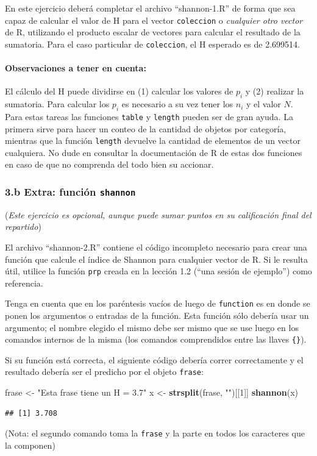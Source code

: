 \documentclass[]{article}
\newenvironment{Shaded}{}{}
\newcommand{\KeywordTok}[1]{\textcolor[rgb]{0.00,0.44,0.13}{\textbf{{#1}}}}
\newcommand{\DecValTok}[1]{\textcolor[rgb]{0.25,0.63,0.44}{{#1}}}
\newcommand{\StringTok}[1]{\textcolor[rgb]{0.25,0.44,0.63}{{#1}}}
\newcommand{\NormalTok}[1]{{#1}}
\begin{document}
En este ejercicio deberá completar el archivo ``shannon-1.R'' de forma
que sea capaz de calcular el valor de H para el vector
\texttt{coleccion} o \emph{cualquier otro vector} de R, utilizando el
producto escalar de vectores para calcular el resultado de la sumatoria.
Para el caso particular de \texttt{coleccion}, el H esperado es de
2.699514.

\paragraph{Observaciones a tener en cuenta:}

El cálculo del H puede dividirse en (1) calcular los valores de $p_i$ y
(2) realizar la sumatoria. Para calcular los $p_i$ es necesario a su vez
tener los $n_i$ y el valor $N$. Para estas tareas las funciones
\texttt{table} y \texttt{length} pueden ser de gran ayuda. La primera
sirve para hacer un conteo de la cantidad de objetos por categoría,
mientras que la función \texttt{length} devuelve la cantidad de
elementos de un vector cualquiera. No dude en consultar la documentación
de R de estas dos funciones en caso de que no comprenda del todo bien su
accionar.

\subsubsection{3.b Extra: función \texttt{shannon}}

(\emph{Este ejercicio es opcional, aunque puede sumar puntos en su
calificación final del repartido})

El archivo ``shannon-2.R'' contiene el código incompleto necesario para
crear una función que calcule el índice de Shannon para cualquier vector
de R. Si le resulta útil, utilice la función \texttt{prp} creada en la
lección 1.2 (``una sesión de ejemplo'') como referencia.

Tenga en cuenta que en los paréntesis vacíos de luego de
\texttt{function} es en donde se ponen los argumentos o entradas de la
función. Esta función sólo debería usar un argumento; el nombre elegido
el mismo debe ser mismo que se use luego en los comandos internos de la
misma (los comandos comprendidos entre las llaves \texttt{\{\}}).

Si su función está correcta, el siguiente código debería correr
correctamente y el resultado debería ser el predicho por el objeto
\texttt{frase}:

\begin{Shaded}
\begin{Highlighting}[]
\NormalTok{frase <- }\StringTok{"Esta frase tiene un H = 3.7"}
\NormalTok{x <- }\KeywordTok{strsplit}\NormalTok{(frase, }\StringTok{""}\NormalTok{)[[}\DecValTok{1}\NormalTok{]]}
\KeywordTok{shannon}\NormalTok{(x)}
\end{Highlighting}
\end{Shaded}
\begin{verbatim}
## [1] 3.708
\end{verbatim}
(Nota: el segundo comando toma la \texttt{frase} y la parte en todos los
caracteres que la componen)
\end{document}
